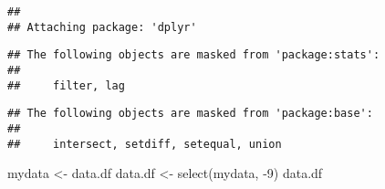 \documentclass[
]{article}
\newenvironment{Shaded}{\begin{snugshade}}{\end{snugshade}}
\newcommand{\DecValTok}[1]{\textcolor[rgb]{0.00,0.00,0.81}{#1}}
\newcommand{\FunctionTok}[1]{\textcolor[rgb]{0.00,0.00,0.00}{#1}}
\newcommand{\NormalTok}[1]{#1}
\newcommand{\OtherTok}[1]{\textcolor[rgb]{0.56,0.35,0.01}{#1}}
\newcommand{\SpecialCharTok}[1]{\textcolor[rgb]{0.00,0.00,0.00}{#1}}
\begin{document}
\begin{verbatim}
## 
## Attaching package: 'dplyr'
\end{verbatim}

\begin{verbatim}
## The following objects are masked from 'package:stats':
## 
##     filter, lag
\end{verbatim}

\begin{verbatim}
## The following objects are masked from 'package:base':
## 
##     intersect, setdiff, setequal, union
\end{verbatim}

\begin{Shaded}
\begin{Highlighting}[]
\NormalTok{mydata }\OtherTok{\textless{}{-}}\NormalTok{ data.df}
\NormalTok{data.df }\OtherTok{\textless{}{-}} \FunctionTok{select}\NormalTok{(mydata, }\SpecialCharTok{{-}}\DecValTok{9}\NormalTok{)}
\NormalTok{data.df}
\end{Highlighting}
\end{Shaded}
\end{document}
